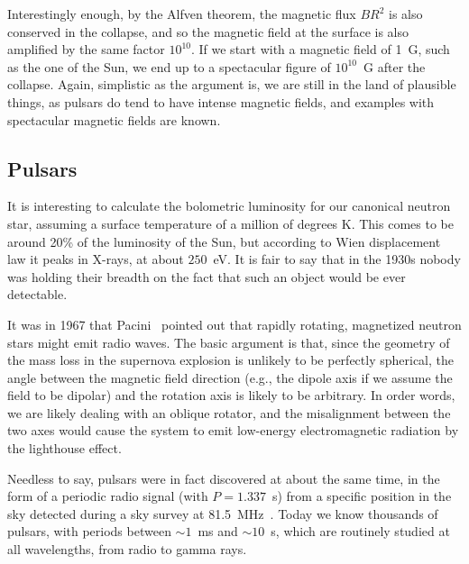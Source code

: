 Interestingly enough, by the Alfven theorem, the magnetic flux $BR^2$ is also conserved
in the collapse,
and so the magnetic field at the surface is also amplified by the same factor $10^{10}$.
If we start with a magnetic field of 1~G, such as the one of the Sun, we end up
to a spectacular figure of $10^{10}$~G after the collapse. Again, simplistic as
the argument is, we are still in the land of plausible things, as pulsars do tend
to have intense magnetic fields, and examples with spectacular magnetic fields are known.



\subsection{Pulsars}
\label{sec:pulsars}

It is interesting to calculate the bolometric luminosity for our canonical neutron
star, assuming a surface temperature of a million of degrees K.
This comes to be around 20\% of the luminosity of the Sun, but according to Wien
displacement law it peaks in X-rays, at about $250$~eV. It is fair to say that in the 1930s nobody
was holding their breadth on the fact that such an object would be ever detectable.

It was in 1967 that Pacini~\cite{1967Natur.216..567P} pointed out that rapidly
rotating, magnetized neutron stars might emit radio waves. The basic argument is
that, since the geometry of the mass loss in the supernova explosion is unlikely
to be perfectly spherical, the angle between the magnetic field direction (e.g.,
the dipole axis if we assume the field to be dipolar) and the rotation axis is
likely to be arbitrary. In order words, we are likely dealing with an oblique rotator,
and the misalignment between the two axes would cause the system to emit low-energy
electromagnetic radiation by the lighthouse effect.

Needless to say, pulsars were in fact discovered at about the same time, in the
form of a periodic radio signal (with $P = 1.337$~s) from a specific position in
the sky detected during a sky survey at 81.5~MHz~\cite{1968Natur.217..709H}.
Today we know thousands of pulsars, with periods between $\sim 1$~ms and $\sim 10$~s,
which are routinely studied at all wavelengths, from radio to gamma rays.

